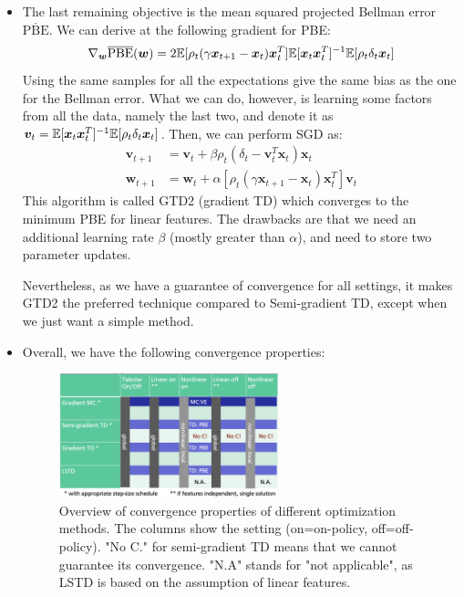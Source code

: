 \begin{itemize}
	\item The last remaining objective is the mean squared projected Bellman error $\overline{\text{PBE}}$. We can derive at the following gradient for PBE:
	$$\nabla_{\bm{w}} \overline{\text{PBE}}(\bm{w}) = 2\mathbb{E}[\rho_t (\gamma \bm{x}_{t+1}-\bm{x}_t)\bm{x}_t^T]\mathbb{E}[\bm{x}_t\bm{x}_t^T]^{-1}\mathbb{E}[\rho_t\delta_t\bm{x}_t]$$
	Using the same samples for all the expectations give the same bias as the one for the Bellman error. What we can do, however, is learning some factors from all the data, namely the last two, and denote it as $\bm{v}_t=\mathbb{E}[\bm{x}_t\bm{x}_t^T]^{-1}\mathbb{E}[\rho_t\delta_t\bm{x}_t]$. Then, we can perform SGD as:
	\begin{equation*}
		\begin{split}
			\bm{v}_{t+1} & = \bm{v}_t + \beta \rho_t (\delta_t - \bm{v}_t^T \bm{x}_t)\bm{x}_t\\
			\bm{w}_{t+1} & = \bm{w}_t + \alpha \left[\rho_t (\gamma \bm{x}_{t+1}-\bm{x}_t)\bm{x}_t^T\right]\bm{v}_t
		\end{split}
	\end{equation*}
	This algorithm is called GTD2 (gradient TD) which converges to the minimum PBE for linear features. The drawbacks are that we need an additional learning rate $\beta$ (mostly greater than $\alpha$), and need to store two parameter updates.
	
	Nevertheless, as we have a guarantee of convergence for all settings, it makes GTD2 the preferred technique compared to Semi-gradient TD, except when we just want a simple method.
	\item Overall, we have the following convergence properties:
	\begin{figure}[ht!]
		\centering
		\includegraphics[width=0.6\textwidth]{figures/rl_approximate_value_based_convergence_overview.png}
		\caption{Overview of convergence properties of different optimization methods. The columns show the setting (on=on-policy, off=off-policy). "No C." for semi-gradient TD means that we cannot guarantee its convergence. "N.A" stands for "not applicable", as LSTD is based on the assumption of linear features.}
	\end{figure}	
\end{itemize}
